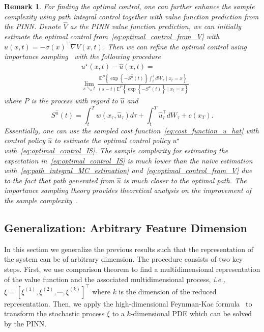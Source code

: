 \documentclass[letterpaper]{article} %
\newcommand{\todo}[1]{\textcolor{blue}{[TODO: #1]}}
\newcommand{\ie}{\textit{i.e., }}
\newtheorem{remark}[theorem]{Remark}
\begin{document}
\begin{remark}
For finding the optimal control, one can further enhance the sample complexity using path integral control together with value function prediction from the PINN. Denote $\hat{V}$ as the PINN value function prediction, we can initially estimate the optimal control from~\eqref{eq:optimal_control_from_V} with $\hat{u}(x,t) =  -\sigma\left(x\right)^\top \nabla \hat{V}\left(x, t\right)$. Then we can refine the optimal control using importance sampling~\cite{thijssen2015path} with the following procedure
\begin{equation}
\label{eq:optimal_control_IS}
\begin{aligned}
& u^{\star}(x, t)-\hat{u}(x, t)= \\
& \lim _{s \searrow t} \frac{\mathbb{E}^{P}\left\{\exp \left\{-S^{\hat{u}}(t)\right\} \int_t^s d W_\tau \mid x_t=x\right\}}{(s-t) \mathbb{E}^{P}\left\{\exp \left\{-S^{\hat{u}}(t)\right\} \mid x_t=x\right\}}
\end{aligned}
\end{equation}
where $P$ is the process with regard to $\hat{u}$ and
\begin{equation}
\label{eq:cost_function_u_hat}
    S^{\hat{u}}(t)=\int_t^T w\left(x_\tau, \hat{u}_\tau\right)
    d \tau+\int_t^T \hat{u}_\tau^{\top} d W_\tau+c\left(x_T\right).
\end{equation}
Essentially, one can use the sampled cost function~\eqref{eq:cost_function_u_hat} with control policy $\hat{u}$ to estimate the optimal control policy $u^\star$ with~\eqref{eq:optimal_control_IS}. The sample complexity for estimating the expectation in~\eqref{eq:optimal_control_IS} is much lower than the naive estimation with~\eqref{eq:path_integral_MC_estimation} and~\eqref{eq:optimal_control_from_V} due to the fact that path generated from $\hat{u}$ is much closer to the optimal path. The importance sampling theory provides theoretical analysis on the improvement of the sample complexity~\cite{thijssen2015path}.
    
\end{remark}


\subsection{Generalization: Arbitrary Feature Dimension}
In this section we generalize the previous results such that the representation of the system can be of arbitrary dimension. The procedure consists of two key steps. First, we use comparison theorem to find a multidimensional representation of the value function and the associated multidimensional process, \ie $\xi = [\xi^{(1)}, \xi^{(2)}, \cdots, \xi^{(k)}]^\top$ where $k$ is the dimension of the reduced representation. Then, we apply the high-dimensional Feynman-Kac formula~\cite[Theorem 1.3.17]{pham2009continuous} to
transform the stochastic process $\xi$ to a $k$-dimensional PDE which can be solved by the PINN.
\end{document}
